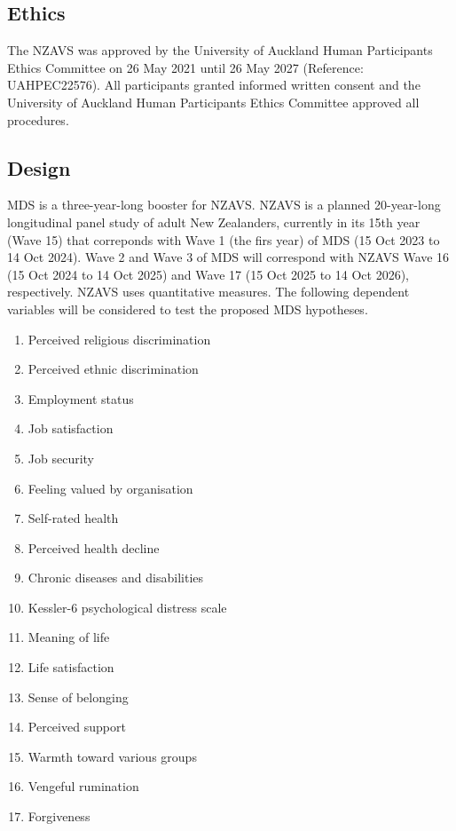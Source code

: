 \documentclass[
]{interact}
\providecommand{\tightlist}{%
  \setlength{\itemsep}{0pt}\setlength{\parskip}{0pt}}\usepackage{longtable,booktabs,array}
\begin{document}
\subsection{Ethics}\label{ethics}

The NZAVS was approved by the University of Auckland Human Participants
Ethics Committee on 26 May 2021 until 26 May 2027 (Reference:
UAHPEC22576). All participants granted informed written consent and the
University of Auckland Human Participants Ethics Committee approved all
procedures.

\subsection{Design}\label{design}

MDS is a three-year-long booster for NZAVS. NZAVS is a planned
20-year-long longitudinal panel study of adult New Zealanders, currently
in its 15th year (Wave 15) that correponds with Wave 1 (the firs year)
of MDS (15 Oct 2023 to 14 Oct 2024). Wave 2 and Wave 3 of MDS will
correspond with NZAVS Wave 16 (15 Oct 2024 to 14 Oct 2025) and Wave 17
(15 Oct 2025 to 14 Oct 2026), respectively. NZAVS uses quantitative
measures. The following dependent variables will be considered to test
the proposed MDS hypotheses.

\begin{enumerate}
\def\labelenumi{\arabic{enumi}.}
\tightlist
\item
  Perceived religious discrimination
\item
  Perceived ethnic discrimination
\item
  Employment status
\item
  Job satisfaction
\item
  Job security
\item
  Feeling valued by organisation
\item
  Self-rated health
\item
  Perceived health decline
\item
  Chronic diseases and disabilities
\item
  Kessler-6 psychological distress scale
\item
  Meaning of life
\item
  Life satisfaction
\item
  Sense of belonging
\item
  Perceived support
\item
  Warmth toward various groups
\item
  Vengeful rumination
\item
  Forgiveness
\end{enumerate}
\end{document}
